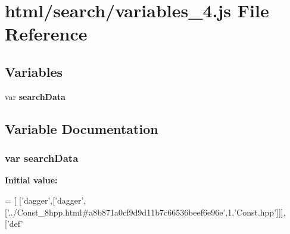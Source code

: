 \section{html/search/variables\-\_\-4.js File Reference}
\label{variables__4_8js}
\subsection*{Variables}
\begin{DoxyCompactItemize}
\item 
var {\bf search\-Data}
\end{DoxyCompactItemize}


\subsection{Variable Documentation}
\subsubsection[{search\-Data}]{\setlength{\rightskip}{0pt plus 5cm}var search\-Data}\label{variables__4_8js_ad01a7523f103d6242ef9b0451861231e}
{\bfseries Initial value\-:}
\begin{DoxyCode}
=
[
  [\textcolor{stringliteral}{'dagger'},[\textcolor{stringliteral}{'dagger'},[\textcolor{stringliteral}{'../Const\_8hpp.html#a8b871a0cf9d9d11b7c66536beef6e96e'},1,\textcolor{stringliteral}{'Const.hpp'}]]],
  [\textcolor{stringliteral}{'def'}
\end{DoxyCode}
